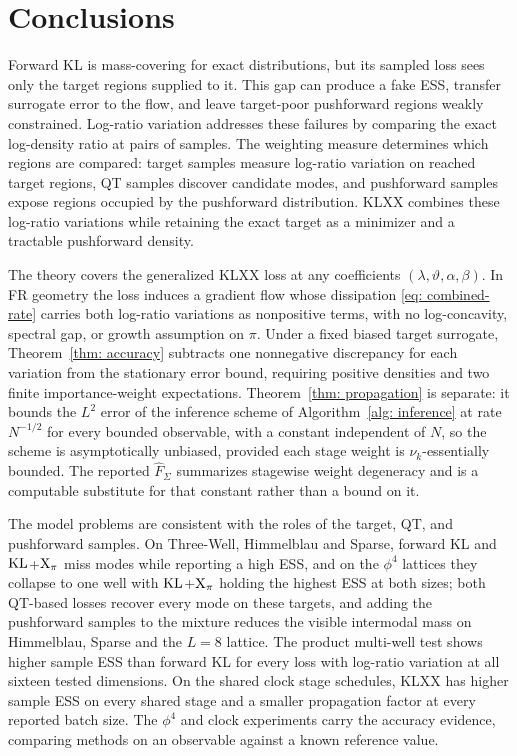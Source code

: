 \documentclass{article}
\begin{document}
\section{Conclusions}
\label{sec: conclusions}

Forward KL is mass-covering for exact distributions, but its sampled loss sees only the target regions supplied to it. This gap can produce a fake ESS, transfer surrogate error to the flow, and leave target-poor pushforward regions weakly constrained. Log-ratio variation addresses these failures by comparing the exact log-density ratio at pairs of samples. The weighting measure determines which regions are compared: target samples measure log-ratio variation on reached target regions, QT samples discover candidate modes, and pushforward samples expose regions occupied by the pushforward distribution. KLXX combines these log-ratio variations while retaining the exact target as a minimizer and a tractable pushforward density.

The theory covers the generalized KLXX loss at any coefficients $(\lambda,\vartheta,\alpha,\beta)$. In FR geometry the loss induces a gradient flow whose dissipation \eqref{eq: combined-rate} carries both log-ratio variations as nonpositive terms, with no log-concavity, spectral gap, or growth assumption on $\pi$. Under a fixed biased target surrogate, Theorem~\ref{thm: accuracy} subtracts one nonnegative discrepancy for each variation from the stationary error bound, {\color{blue}requiring positive densities and two finite importance-weight expectations}. Theorem~\ref{thm: propagation} is separate: it bounds the $L^2$ error of {\color{blue}the inference scheme of Algorithm~\ref{alg: inference}} at rate $N^{-1/2}$ for every bounded observable, with a constant independent of $N$, so the scheme is asymptotically unbiased{\color{purple}, provided each stage weight is $\nu_k$-essentially bounded}. The reported $\hat F_\Sigma$ summarizes stagewise weight degeneracy and is a computable substitute for that constant rather than a bound on it.

The model problems are consistent with the roles of the target, QT, and pushforward samples. {\color{blue}On Three-Well, Himmelblau and Sparse, forward KL and $\mathrm{KL}$+$\mathrm{X}_\pi$ miss modes while reporting a high ESS, and on the $\phi^4$ lattices they collapse to one well with $\mathrm{KL}$+$\mathrm{X}_\pi$ holding the highest ESS at both sizes; both QT-based losses recover every mode on these targets, and adding the pushforward samples to the mixture reduces the visible intermodal mass on Himmelblau, Sparse and the $L=8$ lattice.} {\color{blue}The product multi-well test shows higher sample ESS than forward KL for every loss with log-ratio variation at all sixteen tested dimensions.} On the shared clock stage schedules, KLXX has higher sample ESS on every shared stage and a smaller propagation factor at every reported batch size. {\color{blue}The $\phi^4$ and clock experiments carry the accuracy evidence, comparing methods on an observable against a known reference value.}
\end{document}
